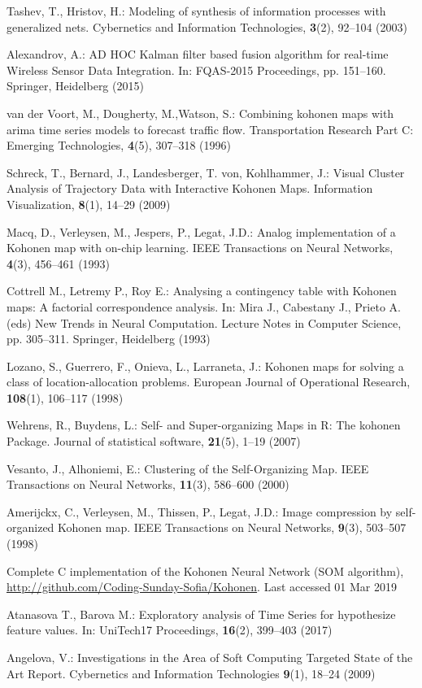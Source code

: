 \documentclass[runningheads]{llncs}
\begin{document}
\begin{thebibliography}{8}

Tashev, T., Hristov, H.: Modeling of synthesis of information processes with generalized nets. Cybernetics and Information Technologies, \textbf{3}(2), 92--104 (2003) 

Alexandrov, A.: AD HOC Kalman filter based fusion algorithm for real-time Wireless Sensor Data Integration. In: FQAS-2015 Proceedings, pp. 151--160. Springer, Heidelberg (2015)

van der Voort, M., Dougherty, M.,Watson, S.: Combining kohonen maps with arima time series models to forecast traffic flow. Transportation Research Part C: Emerging Technologies, \textbf{4}(5), 307--318 (1996) 

Schreck, T., Bernard, J., Landesberger, T. von, Kohlhammer, J.: Visual Cluster Analysis of Trajectory Data with Interactive Kohonen Maps. Information Visualization, \textbf{8}(1), 14--29 (2009)

Macq, D., Verleysen, M., Jespers, P., Legat, J.D.: Analog implementation of a Kohonen map with on-chip learning. IEEE Transactions on Neural Networks, \textbf{4}(3), 456--461 (1993)

Cottrell M., Letremy P., Roy E.: Analysing a contingency table with Kohonen maps: A factorial correspondence analysis. In: Mira J., Cabestany J., Prieto A. (eds) New Trends in Neural Computation. Lecture Notes in Computer Science, pp. 305--311. Springer, Heidelberg (1993)

Lozano, S., Guerrero, F., Onieva, L., Larraneta, J.: Kohonen maps for solving a class of location-allocation problems. European Journal of Operational Research, \textbf{108}(1), 106--117 (1998)

Wehrens, R., Buydens, L.: Self- and Super-organizing Maps in R: The kohonen Package. Journal of statistical software, \textbf{21}(5), 1--19 (2007)

Vesanto, J., Alhoniemi, E.: Clustering of the Self-Organizing Map. IEEE Transactions on Neural Networks, \textbf{11}(3), 586--600 (2000) 

Amerijckx, C., Verleysen, M., Thissen, P., Legat, J.D.: Image compression by self-organized Kohonen map. IEEE Transactions on Neural Networks, \textbf{9}(3), 503--507 (1998)

Complete C implementation of the Kohonen Neural Network (SOM algorithm), \url{http://github.com/Coding-Sunday-Sofia/Kohonen}. Last accessed 01 Mar 2019

Atanasova T., Barova M.: Exploratory analysis of Time Series for hypothesize feature values. In: UniTech17 Proceedings,  \textbf{16}(2), 399--403 (2017)

Angelova, V.: Investigations in the Area of Soft Computing Targeted State of the Art Report. Cybernetics and Information Technologies \textbf{9}(1), 18--24 (2009)

\end{thebibliography}
\end{document}
